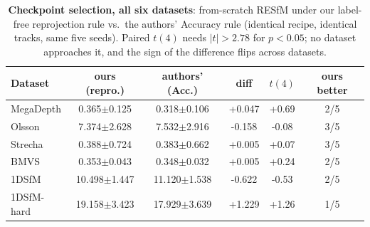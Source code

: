 \documentclass{article}
\begin{document}
\begin{table}[h]\centering\footnotesize
\caption{\textbf{Checkpoint selection, all six datasets}: from-scratch RESfM under our
label-free reprojection rule vs.\ the authors' Accuracy rule (identical recipe, identical
tracks, same five seeds). Paired $t(4)$ needs $|t|>2.78$ for $p<0.05$; no dataset
approaches it, and the sign of the difference flips across datasets.}
\label{tab:selrules}
\setlength{\tabcolsep}{4pt}%
\begin{tabular}{lccccc}
\toprule
Dataset & ours (repro.) & authors' (Acc.) & diff & $t(4)$ & ours better\\
\midrule
MegaDepth & 0.365$\pm$0.125 & 0.318$\pm$0.106 & +0.047 & +0.69 & 2/5\\
Olsson & 7.374$\pm$2.628 & 7.532$\pm$2.916 & -0.158 & -0.08 & 3/5\\
Strecha & 0.388$\pm$0.724 & 0.383$\pm$0.662 & +0.005 & +0.07 & 3/5\\
BMVS & 0.353$\pm$0.043 & 0.348$\pm$0.032 & +0.005 & +0.24 & 2/5\\
1DSfM & 10.498$\pm$1.447 & 11.120$\pm$1.538 & -0.622 & -0.53 & 2/5\\
1DSfM-hard & 19.158$\pm$3.423 & 17.929$\pm$3.639 & +1.229 & +1.26 & 1/5\\
\bottomrule
\end{tabular}
\end{table}
\end{document}
